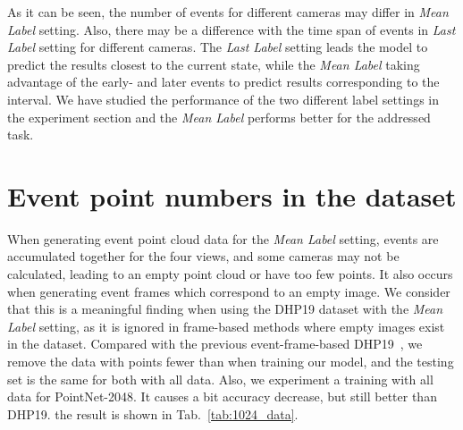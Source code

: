 \documentclass[10pt,twocolumn,letterpaper]{article}
\begin{document}
As it can be seen, the number of events for different cameras may differ in \emph{Mean Label} setting. Also, there may be a difference with the time span of events in \emph{Last Label} setting for different cameras.  The \emph{Last Label} setting leads the model to predict the results closest to the current state, while the \emph{Mean Label} taking advantage of the early- and later events to predict results corresponding to the interval. We have studied the performance of the two different label settings in the experiment section and the \emph{Mean Label} performs better for the addressed task.

\section{Event point numbers in the dataset}
When generating event point cloud data for the \emph{Mean Label} setting, events are accumulated together for the four views, and some cameras may not be calculated, leading to an empty point cloud or have too few points.
It also occurs when generating event frames which correspond to an empty image.
We consider that this is a meaningful finding when using the DHP19 dataset with the \emph{Mean Label} setting, as it is ignored in frame-based methods where empty images exist in the dataset. Compared with the previous event-frame-based DHP19~\cite{calabrese2019dhp19}, we remove the data with points fewer than  when training our model, and the testing set is the same for both with all data. Also, we experiment a training with all data for PointNet-2048. It causes a bit accuracy decrease, but still better than DHP19.
the result is shown in Tab.~\ref{tab:1024_data}.
\begin{table}[h]
\renewcommand\thetable{B}
\footnotesize
   \centering
         \caption{Ablation experiment on training data.}
\label{tab:1024_data}
\end{table}
\end{document}
